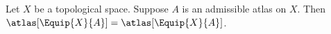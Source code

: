 

\begin{proposition}\label{ordinary_provider_projection_stays_ambiguous}
    Let $X$ be a topological space.
    Suppose $A$ is an admissible atlas on $X$.
    Then $\atlas[\Equip{X}{A}]=\atlas[\Equip{X}{A}]$.
\end{proposition}

